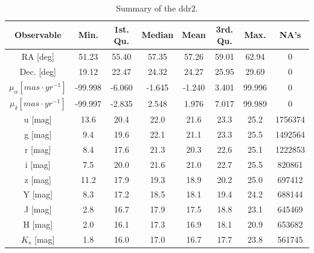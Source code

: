 \begin{table}[htdp]
\caption{Summary of the \gls{ddr2}.}
\begin{center}
\begin{tabular}{|c|c|c|c|c|c|c|c|}
\hline
Observable & Min. & 1st. Qu. & Median & Mean & 3rd. Qu. & Max. & NA's \\
\hline
\hline
RA [deg]&51.23 & 55.40 & 57.35 & 57.26 & 59.01 & 62.94 & 0\\
Dec. [deg] &19.12 &22.47 & 24.32 & 24.27  & 25.95 & 29.69 &0\\
$\mu_{\alpha} [mas\cdot yr^{-1}]$&-99.998& -6.060& -1.645& -1.240&3.401&99.996&0\\
$\mu_{\delta} [mas\cdot yr^{-1}]$&-99.997& -2.835&  2.548&  1.976&  7.017&99.989&0\\
u [mag]&13.6&20.4 &22.0 &21.6&23.3&25.2&1756374\\
g [mag]& 9.4   &19.6   &22.1   &21.1   &23.3   &25.5 &1492564\\
r [mag] &  8.4  &17.6   &21.3   &20.3   &22.6   &25.1   &1222853\\
i [mag] &  7.5  &20.0  &21.6  &21.0  &22.7  &25.5  &820861\\
z [mag]&11.2  &17.9  &19.3  &18.9  &20.2  &25.0  &697412\\
Y [mag]& 8.3  &17.2  &18.5  &18.1  &19.4  &24.2  &688144\\
J [mag]& 2.8  &16.7  &17.9  &17.5  &18.8  &23.1  &645469\\
H [mag]& 2.0  &16.1  &17.3  &16.9  &18.1  &20.9  &653682\\
$K_s$ [mag]& 1.8 &16.0&  17.0  &16.7  &17.7  &23.8  &561745\\
\hline
\end{tabular}
\end{center}
\label{tab:DR2properties}
\end{table}%

